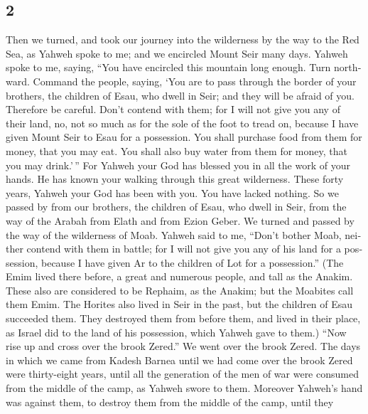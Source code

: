 \begin{paracol}{2}
\begin{otherlanguage}{english}
\hypertarget{section-3}{%
\section{2}\label{section-3}}

 Then we turned, and took our journey into the wilderness
by the way to the Red Sea, as Yahweh spoke to me; and we encircled Mount
Seir many days.  Yahweh spoke to me, saying,
 ``You have encircled this mountain long enough. Turn
northward.  Command the people, saying, `You are to pass
through the border of your brothers, the children of Esau, who dwell in
Seir; and they will be afraid of you. Therefore be careful.
 Don't contend with them; for I will not give you any of
their land, no, not so much as for the sole of the foot to tread on,
because I have given Mount Seir to Esau for a possession. 
You shall purchase food from them for money, that you may eat. You shall
also buy water from them for money, that you may drink.'\,''
 For Yahweh your God has blessed you in all the work of
your hands. He has known your walking through this great wilderness.
These forty years, Yahweh your God has been with you. You have lacked
nothing.  So we passed by from our brothers, the children
of Esau, who dwell in Seir, from the way of the Arabah from Elath and
from Ezion Geber. We turned and passed by the way of the wilderness of
Moab.  Yahweh said to me, ``Don't bother Moab, neither
contend with them in battle; for I will not give you any of his land for
a possession, because I have given Ar to the children of Lot for a
possession.''  (The Emim lived there before, a great and
numerous people, and tall as the Anakim.  These also are
considered to be Rephaim, as the Anakim; but the Moabites call them
Emim.  The Horites also lived in Seir in the past, but
the children of Esau succeeded them. They destroyed them from before
them, and lived in their place, as Israel did to the land of his
possession, which Yahweh gave to them.)  ``Now rise up
and cross over the brook Zered.'' We went over the brook Zered.
 The days in which we came from Kadesh Barnea until we
had come over the brook Zered were thirty-eight years, until all the
generation of the men of war were consumed from the middle of the camp,
as Yahweh swore to them.  Moreover Yahweh's hand was
against them, to destroy them from the middle of the camp, until they

\end{otherlanguage}
\end{paracol}
